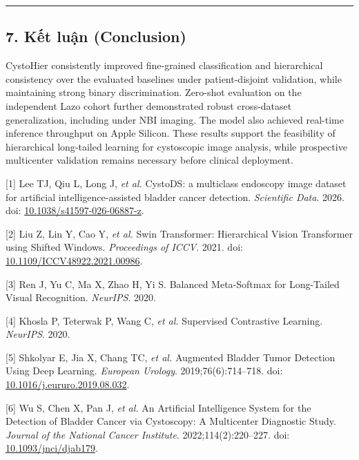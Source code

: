 \documentclass[
  11pt,
  a4paper,
]{article}
\begin{document}
\begin{center}\rule{0.5\linewidth}{0.5pt}\end{center}

\subsection{7. Kết luận
(Conclusion)}\label{kux1ebft-luux1eadn-conclusion}

CystoHier consistently improved fine-grained classification and
hierarchical consistency over the evaluated baselines under
patient-disjoint validation, while maintaining strong binary
discrimination. Zero-shot evaluation on the independent Lazo cohort
further demonstrated robust cross-dataset generalization, including
under NBI imaging. The model also achieved real-time inference
throughput on Apple Silicon. These results support the feasibility of
hierarchical long-tailed learning for cystoscopic image analysis, while
prospective multicenter validation remains necessary before clinical
deployment.

{[}1{]} Lee TJ, Qiu L, Long J, \emph{et al.} CystoDS: a multiclass
endoscopy image dataset for artificial intelligence-assisted bladder
cancer detection. \emph{Scientific Data}. 2026. doi:
\href{https://doi.org/10.1038/s41597-026-06887-z}{10.1038/s41597-026-06887-z}.

{[}2{]} Liu Z, Lin Y, Cao Y, \emph{et al.} Swin Transformer:
Hierarchical Vision Transformer using Shifted Windows. \emph{Proceedings
of ICCV}. 2021. doi:
\href{https://doi.org/10.1109/ICCV48922.2021.00986}{10.1109/ICCV48922.2021.00986}.

{[}3{]} Ren J, Yu C, Ma X, Zhao H, Yi S. Balanced Meta-Softmax for
Long-Tailed Visual Recognition. \emph{NeurIPS}. 2020.

{[}4{]} Khosla P, Teterwak P, Wang C, \emph{et al.} Supervised
Contrastive Learning. \emph{NeurIPS}. 2020.

{[}5{]} Shkolyar E, Jia X, Chang TC, \emph{et al.} Augmented Bladder
Tumor Detection Using Deep Learning. \emph{European Urology}.
2019;76(6):714--718. doi:
\href{https://doi.org/10.1016/j.eururo.2019.08.032}{10.1016/j.eururo.2019.08.032}.

{[}6{]} Wu S, Chen X, Pan J, \emph{et al.} An Artificial Intelligence
System for the Detection of Bladder Cancer via Cystoscopy: A Multicenter
Diagnostic Study. \emph{Journal of the National Cancer Institute}.
2022;114(2):220--227. doi:
\href{https://doi.org/10.1093/jnci/djab179}{10.1093/jnci/djab179}.
\end{document}
